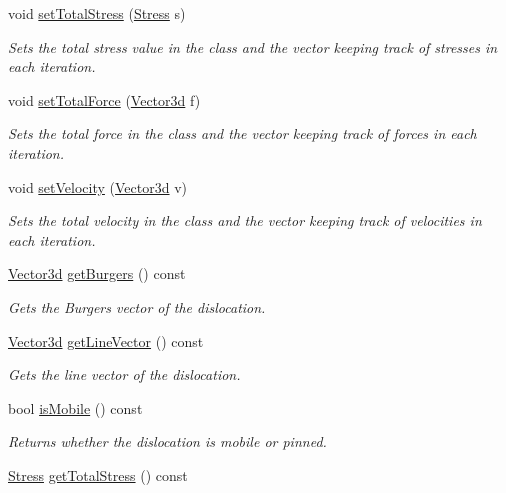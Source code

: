 \begin{DoxyCompactItemize}
void \hyperlink{classDislocation_acc1b0c77cc1150cc7d6d7bc098acb610}{set\-Total\-Stress} (\hyperlink{classStress}{\-Stress} s)
\begin{DoxyCompactList}\small\item\em \-Sets the total stress value in the class and the vector keeping track of stresses in each iteration. \end{DoxyCompactList}\item 
void \hyperlink{classDislocation_aebe391b1ed71cd98b506abbdd493fc31}{set\-Total\-Force} (\hyperlink{classVector3d}{\-Vector3d} f)
\begin{DoxyCompactList}\small\item\em \-Sets the total force in the class and the vector keeping track of forces in each iteration. \end{DoxyCompactList}\item 
void \hyperlink{classDislocation_aeb55f4d1364d2e33891e41868592c629}{set\-Velocity} (\hyperlink{classVector3d}{\-Vector3d} v)
\begin{DoxyCompactList}\small\item\em \-Sets the total velocity in the class and the vector keeping track of velocities in each iteration. \end{DoxyCompactList}\item 
\hyperlink{classVector3d}{\-Vector3d} \hyperlink{classDislocation_a9eb3cc78d08d26a29d5f318a33f6065e}{get\-Burgers} () const 
\begin{DoxyCompactList}\small\item\em \-Gets the \-Burgers vector of the dislocation. \end{DoxyCompactList}\item 
\hyperlink{classVector3d}{\-Vector3d} \hyperlink{classDislocation_a8ba2d0d68c7b335e5c75b7498b33803d}{get\-Line\-Vector} () const 
\begin{DoxyCompactList}\small\item\em \-Gets the line vector of the dislocation. \end{DoxyCompactList}\item 
bool \hyperlink{classDislocation_a741fe1113b1693a6b2f3ad364e9508fe}{is\-Mobile} () const 
\begin{DoxyCompactList}\small\item\em \-Returns whether the dislocation is mobile or pinned. \end{DoxyCompactList}\item 
\hyperlink{classStress}{\-Stress} \hyperlink{classDislocation_a2e07940bcbec8e998f31769f9cc0f5f2}{get\-Total\-Stress} () const 

\end{DoxyCompactItemize}
